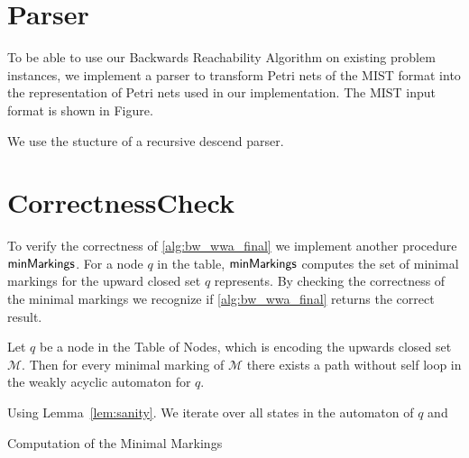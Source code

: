 
\section{Parser}
To be able to use our Backwards Reachability Algorithm on existing problem instances, we implement a parser to transform Petri nets of the MIST format into the representation of Petri nets used in our implementation. 
The MIST input format is shown in Figure. 

We use the stucture of a recursive descend parser. 

\section{CorrectnessCheck}
To verify the correctness of \autoref{alg:bw_wwa_final} we implement another procedure $\operatorname{\textsf{minMarkings}}$. For a node $q$ in the table, $\operatorname{\textsf{minMarkings}}$ computes the set of minimal markings for the upward closed set $q$ represents. By checking the correctness of the minimal markings we recognize if \autoref{alg:bw_wwa_final} returns the correct result.

\begin{lemma}\label{lem:sanity}
Let $q$ be a node in the Table of Nodes, which is encoding the upwards closed set $\mathcal{M}$. Then for every minimal marking of $\mathcal{M}$ there exists a path without self loop in the weakly acyclic automaton for $q$.
\end{lemma}

Using Lemma~\autoref{lem:sanity}.
We iterate over all states in the automaton of $q$ and 

\begin{algorithm}[htb]
\caption{Computation of the Minimal Markings}\label{alg:sanity}
\end{algorithm}



